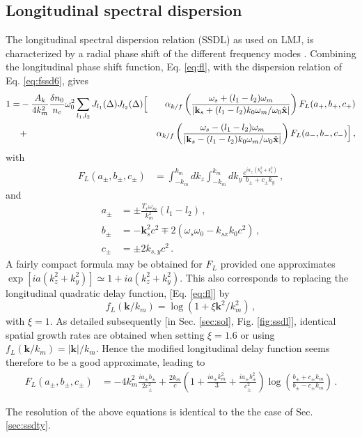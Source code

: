 \documentclass[
 reprint,
 amsmath,amssymb,
 aps,
]{revtex4-1}
\begin{document}
\begin{widetext}
\subsection{Longitudinal  spectral dispersion}\label{sec:ssdl}
The longitudinal spectral dispersion relation (SSDL) as used on LMJ, is characterized by a radial phase shift of the different frequency modes \cite[]{POP_Duluc_2019}. Combining the longitudinal phase shift function,  Eq. \eqref{eq:fl}, with the dispersion relation of Eq. \eqref{eq:fssd6}, gives \begin{align}
   1 =& - \frac{A_k}{4k_m^2}  \frac{\delta n_0}{n_c}\omega_0^2
    \sum_{l_1, l_2} 
     J_{l_1}(\Delta)J_{l_2}(\Delta) 
      \Big[&
       \alpha_{k/f}\left(\frac{\omega_s+(l_1-l_2)\omega_m}
  {\vert\mathbf{k}_s+(l_1-l_2)k_0\omega_m/\omega_0\Hat{\mathbf{x}} \vert}
  \right) 
       F_L(a_+,b_+,c_+)
     \nonumber \\&
      + &\alpha_{k/f}\left(\frac{\omega_s-(l_1-l_2)\omega_m}
  {\vert\mathbf{k}_s-(l_1-l_2)k_0\omega_m/\omega_0\Hat{\mathbf{x}} \vert}
  \right) 
     F_L(a_-,b_-,c_-)
    \Big]
   \, ,\label{eq:fssdl}
   \end{align}
with 
\begin{align}
    F_L(a_\pm,b_\pm,c_\pm)&= \int_{-k_m}^{k_m}dk_z\int_{-k_m}^{k_m} dk_y \frac{e^{ia_\pm(k_y^2 + k_z^2)}}{b_\pm+c_\pm k_y }\, ,
\end{align}
and
\begin{align}
    a_\pm&=\pm\frac{T_r\omega_m}{k_m^2}(l_1-l_2)\, ,\label{eq:fla}\\
    b_\pm&=- \mathbf{k}_s^2c^2 \mp 2(\omega_s\omega_{0}-k_{sx}k_0c^2) \, ,\label{eq:flb} \\
    c_\pm&=\pm 2 k_{s,y}c^2\, .\label{eq:flc}
\end{align}
A fairly compact formula may be obtained for $F_L$ provided one approximates $\exp[ia(k_z^2+k_y^2)]\simeq 1+ia(k_z^2+k_y^2)$. This also corresponds to replacing the longitudinal quadratic delay function, [Eq. \eqref{eq:fl}] by 
\begin{equation}\label{eq:fl_ap}
f_L(\mathbf{k}/k_m) = \log(1+\xi \mathbf{k}^2/k_m^2)\, ,
\end{equation}
with $\xi=1$. As detailed subsequently [in Sec. \ref{sec:sol}, Fig. \ref{fig:ssdl}], identical spatial growth rates are obtained when setting $\xi=1.6$ or using   $f_L(\mathbf{k}/k_m) = \vert \mathbf{k}\vert /k_m$.  Hence the modified longitudinal delay function   seems therefore to be a good approximate, leading to 
\begin{align}
    F_L(a_\pm,b_\pm,c_\pm)&=-4k_m^2 \frac{ia_\pm b_\pm}{2c_\pm^2} +\frac{2k_m}{c}\left(1+\frac{ia_\pm k_m^2}{3}+\frac{ia_\pm b_\pm^2}{c_\pm^2}\right) \log\left( \frac{b_\pm+c_\pm k_m}{b_\pm-c_\pm k_m}   \right) \, .
\end{align}
\end{widetext}
The resolution of the above equations is identical to the the case of Sec. \ref{sec:ssdty}.
\end{document}
